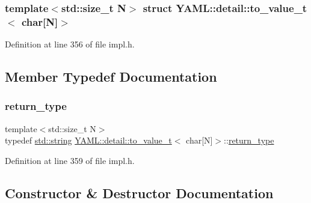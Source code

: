 \subsubsection*{template$<$std\+::size\+\_\+t N$>$\newline
struct Y\+A\+M\+L\+::detail\+::to\+\_\+value\+\_\+t$<$ char\mbox{[}\+N\mbox{]}$>$}



Definition at line 356 of file impl.\+h.



\subsection{Member Typedef Documentation}
\mbox{\label{struct_y_a_m_l_1_1detail_1_1to__value__t_3_01char[_n]_4_a2a232ec362cd04a84ac5019268259923}} 
\subsubsection{\texorpdfstring{return\_type}{return\_type}}
{\footnotesize\ttfamily template$<$std\+::size\+\_\+t N$>$ \\
typedef \mbox{\hyperlink{glad_8h_ac83513893df92266f79a515488701770}{std\+::string}} \mbox{\hyperlink{struct_y_a_m_l_1_1detail_1_1to__value__t}{Y\+A\+M\+L\+::detail\+::to\+\_\+value\+\_\+t}}$<$ char\mbox{[}N\mbox{]}$>$\+::\mbox{\hyperlink{struct_y_a_m_l_1_1detail_1_1to__value__t_3_01char[_n]_4_a2a232ec362cd04a84ac5019268259923}{return\+\_\+type}}}



Definition at line 359 of file impl.\+h.



\subsection{Constructor \& Destructor Documentation}
\mbox{\label{struct_y_a_m_l_1_1detail_1_1to__value__t_3_01char[_n]_4_a298c5e86c0eea6db34f432664008f5d6}} 
